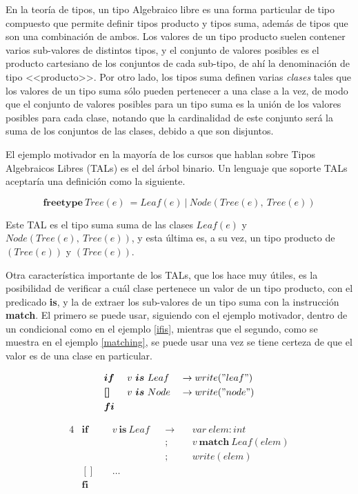 
En la teoría de tipos, un tipo Algebraico libre es una forma particular de tipo
compuesto que permite definir tipos producto y tipos suma, además de tipos que
son una combinación de ambos. Los valores de un tipo producto suelen contener
varios sub-valores de distintos tipos, y el conjunto de valores posibles es el
producto cartesiano de los conjuntos de cada sub-tipo, de ahí la denominación de
tipo <<producto>>. Por otro lado, los tipos suma definen varias \textit{clases}
tales que  los valores de un tipo suma sólo pueden pertenecer a una clase a la
vez, de modo que el conjunto de valores posibles para un tipo suma es la unión
de los valores posibles para cada clase, notando que la cardinalidad de este
conjunto será la suma de los conjuntos de las clases, debido a que son
disjuntos.

El ejemplo motivador en la mayoría de los cursos que hablan sobre Tipos
Algebraicos Libres (TALs) es el del árbol binario. Un lenguaje que soporte TALs
aceptaría una definición como la siguiente.

$$ \textbf{freetype}\ Tree(e)\ = Leaf(e)\ |\ Node(Tree(e),\ Tree(e)) $$

Este TAL es el tipo suma suma de las clases
$Leaf(e)$ y $Node(Tree(e),\ Tree(e))$,
y esta última es, a su vez, un tipo producto de $(Tree(e))$ y $(Tree(e))$.

Otra característica importante de los TALs, que los hace muy útiles, es la
posibilidad de verificar a cuál clase pertenece un valor de un tipo producto,
con el predicado \textbf{is}, y la de extraer los sub-valores de un tipo suma
con la instrucción \textbf{match}. El primero se puede usar, siguiendo con el
ejemplo motivador, dentro de un condicional como en el ejemplo \ref{ifis},
mientras que el segundo, como se muestra en el ejemplo \ref{matching}, se puede
usar una vez se tiene certeza de que el valor es de una clase en particular.

\begin{alignat}{3}
&\boldsymbol{if}\ && v\ \boldsymbol{is}\ Leaf && \rightarrow write("leaf") \nonumber \\
&\boldsymbol{[]}\ && v\ \boldsymbol{is}\ Node && \rightarrow write("node") \label{ifis} \\
&\boldsymbol{fi} \nonumber
\end{alignat}

\begin{alignat}{4}
&\boldsymbol{if}\ && v\ \boldsymbol{is}\ Leaf && \rightarrow &&\ var\ elem : int                   \nonumber \\
&                 &&                          &&           ; &&\ v\ \boldsymbol{match}\ Leaf(elem) \nonumber \\
&                 &&                          &&           ; &&\ write (elem)                      \label{matching} \\
&\boldsymbol{[]}\ && \ldots                                                                        \nonumber \\
&\boldsymbol{fi}                                                                                   \nonumber
\end{alignat}

